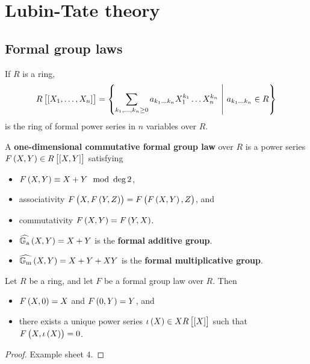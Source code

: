 \section{Lubin-Tate theory}

\subsection{Formal group laws}


If $ R $ is a ring,
$$ R\sbr{\sbr{X_1, \dots, X_n}} = \cbr{\sum_{k_1, \dots, k_n \ge 0} a_{k_1 \dots k_n}X_1^{k_1} \dots X_n^{k_n} \st a_{k_1 \dots k_n} \in R} $$
is the ring of formal power series in $ n $ variables over $ R $.

\begin{definition}
A \textbf{one-dimensional commutative formal group law} over $ R $ is a power series $ F\br{X, Y} \in R\sbr{\sbr{X, Y}} $ satisfying
\begin{itemize}
\item $ F\br{X, Y} \equiv X + Y \mod \deg 2 $,
\item associativity $ F\br{X, F\br{Y, Z}} = F\br{F\br{X, Y}, Z} $, and
\item commutativity $ F\br{X, Y} = F\br{Y, X} $.
\end{itemize}
\end{definition}

\begin{example*}
\hfill
\begin{itemize}
\item $ \widehat{\GG_\a}\br{X, Y} = X + Y $ is the \textbf{formal additive group}.
\item $ \widehat{\GG_\m}\br{X, Y} = X + Y + XY $ is the \textbf{formal multiplicative group}.
\end{itemize}
\end{example*}

\begin{lemma}
Let $ R $ be a ring, and let $ F $ be a formal group law over $ R $. Then
\begin{itemize}
\item $ F\br{X, 0} = X $ and $ F\br{0, Y} = Y $, and
\item there exists a unique power series $ \iota\br{X} \in XR\sbr{\sbr{X}} $ such that $ F\br{X, \iota\br{X}} = 0 $.
\end{itemize}
\end{lemma}

\begin{proof}
Example sheet $ 4 $.
\end{proof}

